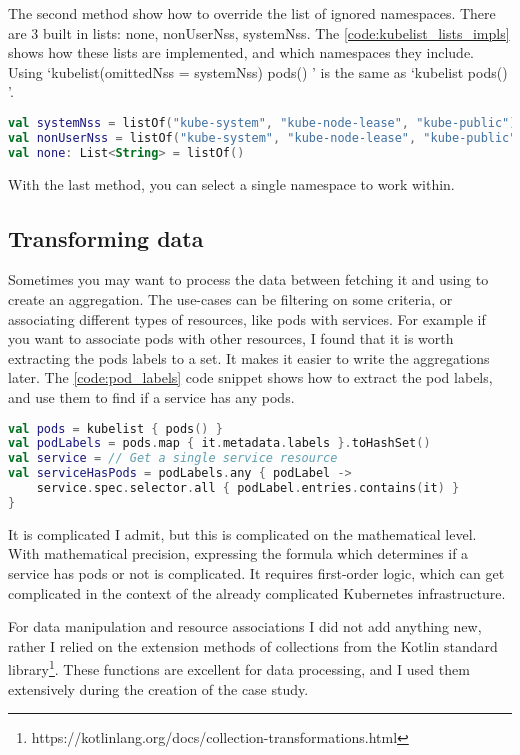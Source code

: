 The second method show how to override the list of ignored namespaces. There are 3 built in lists: none, nonUserNss, systemNss. The \ref{code:kubelist_lists_impls} shows how these lists are implemented, and which namespaces they include. Using `kubelist(omittedNss = systemNss) { pods() }' is the same as `kubelist { pods() }'.

\begin{lstlisting}[caption={Usages of kubelist},language=Kotlin,label=code:kubelist_lists_impls]
val systemNss = listOf("kube-system", "kube-node-lease", "kube-public")
val nonUserNss = listOf("kube-system", "kube-node-lease", "kube-public", "default")
val none: List<String> = listOf()
\end{lstlisting}

With the last method, you can select a single namespace to work within.

\subsection{Transforming data}

Sometimes you may want to process the data between fetching it and using to create an aggregation. The use-cases can be filtering on some criteria, or associating different types of resources, like pods with services. For example if you want to associate pods with other resources, I found that it is worth extracting the pods labels to a set. It makes it easier to write the aggregations later. The \ref{code:pod_labels} code snippet shows how to extract the pod labels, and use them to find if a service has any pods.

\begin{lstlisting}[caption={Extraction of pod labels},language=Kotlin,label=code:pod_labels]
val pods = kubelist { pods() }
val podLabels = pods.map { it.metadata.labels }.toHashSet()
val service = // Get a single service resource
val serviceHasPods = podLabels.any { podLabel ->
    service.spec.selector.all { podLabel.entries.contains(it) }
}
\end{lstlisting}

It is complicated I admit, but this is complicated on the mathematical level. With mathematical precision, expressing the formula which determines if a service has pods or not is complicated. It requires first-order logic, which can get complicated in the context of the already complicated Kubernetes infrastructure.

For data manipulation and resource associations I did not add anything new, rather I relied on the extension methods of collections from the Kotlin standard library\footnote{https://kotlinlang.org/docs/collection-transformations.html}. These functions are excellent for data processing, and I used them extensively during the creation of the case study.

